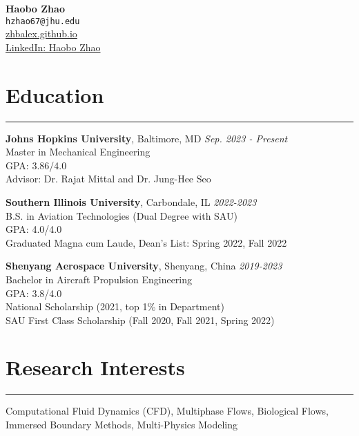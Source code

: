 \documentclass[11pt]{article}
\begin{document}

\begin{center}
    {\LARGE \textbf{Haobo Zhao}} \\
    \vspace{2mm}
    \small
    \texttt{hzhao67@jhu.edu} \\
    \vspace{1mm}
    \href{https://zhbalex.github.io}{zhbalex.github.io} \\
    \href{https://www.linkedin.com/in/haobo-zhao-035529229}{LinkedIn: Haobo Zhao}
\end{center}

\vspace{2mm}

\section*{Education}
\hrule

\noindent\textbf{Johns Hopkins University}, Baltimore, MD \hfill \textit{Sep. 2023 - Present} \\
Master in Mechanical Engineering \\
GPA: 3.86/4.0 \\
Advisor: Dr. Rajat Mittal and Dr. Jung-Hee Seo

\vspace{2mm}

\noindent\textbf{Southern Illinois University}, Carbondale, IL \hfill \textit{2022-2023} \\
B.S. in Aviation Technologies (Dual Degree with SAU) \\
GPA: 4.0/4.0 \\
Graduated Magna cum Laude, Dean's List: Spring 2022, Fall 2022

\vspace{2mm}

\noindent\textbf{Shenyang Aerospace University}, Shenyang, China \hfill \textit{2019-2023} \\
Bachelor in Aircraft Propulsion Engineering \\
GPA: 3.8/4.0 \\
National Scholarship (2021, top 1\% in Department) \\
SAU First Class Scholarship (Fall 2020, Fall 2021, Spring 2022)

\vspace{2mm}

\section*{Research Interests}
\hrule
Computational Fluid Dynamics (CFD), Multiphase Flows, Biological Flows, Immersed Boundary Methods, Multi-Physics Modeling
\end{document}
